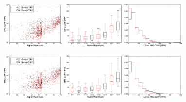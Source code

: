 \begin{figure}[p]
\begin{center}
\includegraphics[width=0.28\textwidth]{figures/cpm/f6a}
\includegraphics[width=0.28\textwidth]{figures/cpm/f6b}
\includegraphics[width=0.28\textwidth]{figures/cpm/f6c}

\includegraphics[width=0.28\textwidth]{figures/cpm/f6d}
\includegraphics[width=0.28\textwidth]{figures/cpm/f6e}
\includegraphics[width=0.28\textwidth]{figures/cpm/f6f}


\end{center}
\end{figure}
